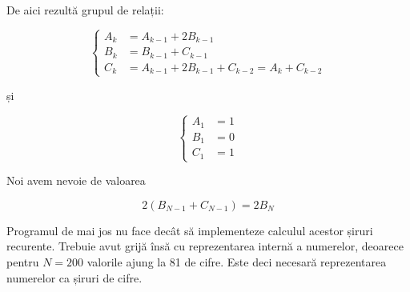 De aici rezultă grupul de relații:

\begin{equation}
  \begin{cases}
    A_k & = A_{k - 1} + 2B_{k - 1} \\
    B_k & = B_{k - 1} + C_{k - 1} \\
    C_k & = A_{k - 1} + 2B_{k - 1} + C_{k - 2} = A_k + C_{k - 2}
  \end{cases}
\end{equation}

și

\begin{equation}
  \begin{cases}
    A_1 & = 1 \\
    B_1 & = 0 \\
    C_1 & = 1
  \end{cases}
\end{equation}

Noi avem nevoie de valoarea 

\begin{equation}
  2(B_{N-1} + C_{N-1}) = 2B_N
\end{equation}

Programul de mai jos nu face decât să implementeze calculul acestor șiruri
recurente. Trebuie avut grijă însă cu reprezentarea internă a numerelor,
deoarece pentru $N=200$ valorile ajung la 81 de cifre. Este deci necesară
reprezentarea numerelor ca șiruri de cifre.

\inputminted{c}{src/problem6.c}
